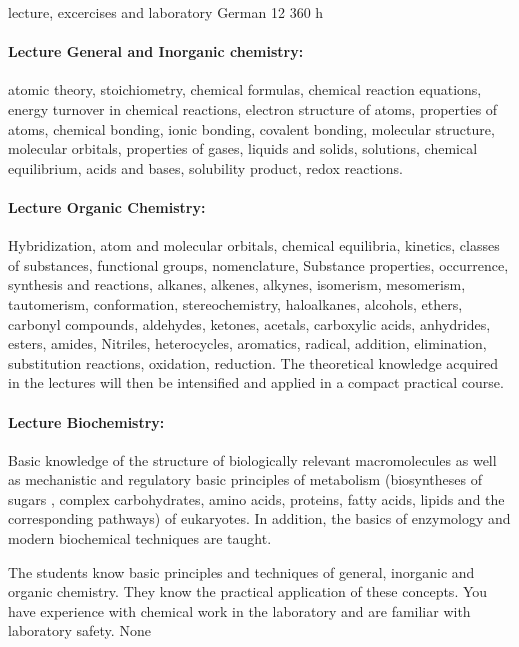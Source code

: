 {lecture, excercises and laboratory}
{German}
{12}
{360 h}
{\paragraph{Lecture General and Inorganic chemistry:} atomic theory, stoichiometry, chemical formulas, chemical reaction equations, energy turnover in chemical reactions, electron structure of atoms, properties of atoms, chemical bonding, ionic bonding, covalent bonding, molecular structure, molecular orbitals, properties of gases, liquids and solids, solutions, chemical equilibrium, acids and bases, solubility product, redox reactions.
\paragraph{Lecture Organic Chemistry: } Hybridization, atom and molecular orbitals, chemical equilibria, kinetics, classes of substances, functional groups, nomenclature, Substance properties, occurrence, synthesis and reactions, alkanes, alkenes, alkynes, isomerism, mesomerism, tautomerism, conformation, stereochemistry, haloalkanes, alcohols, ethers, carbonyl compounds, aldehydes, ketones, acetals, carboxylic acids, anhydrides, esters, amides, Nitriles, heterocycles, aromatics, radical, addition, elimination, substitution reactions, oxidation, reduction. The theoretical knowledge acquired in the lectures will then be intensified and applied in a compact practical course.
\paragraph{Lecture Biochemistry:} Basic knowledge of the structure of biologically relevant macromolecules as well as mechanistic and regulatory basic principles of metabolism (biosyntheses of sugars , complex carbohydrates, amino acids, proteins, fatty acids, lipids and the corresponding pathways) of eukaryotes. In addition, the basics of enzymology and modern biochemical techniques are taught.}
{The students know basic principles and techniques of general, inorganic and organic chemistry. They know the practical application of these concepts. You have experience with chemical work in the laboratory and are familiar with laboratory safety.}
{None}